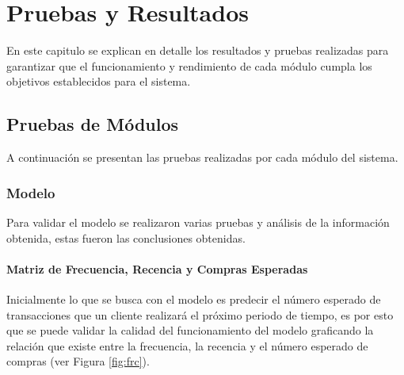 
\chapter{Pruebas y Resultados}

En este capitulo se explican en detalle los resultados y pruebas realizadas para garantizar que el funcionamiento y rendimiento de cada módulo cumpla los objetivos establecidos para el sistema.

\section{Pruebas de Módulos}

A continuación se presentan las pruebas realizadas por cada módulo del sistema.

\subsection{Modelo}

Para validar el modelo se realizaron varias pruebas y análisis de la información obtenida, estas fueron las conclusiones obtenidas.

\subsubsection{Matriz de Frecuencia, Recencia y Compras Esperadas}

Inicialmente lo que se busca con el modelo es predecir el número esperado de transacciones que un cliente realizará el próximo periodo de tiempo, es por esto que se puede validar la calidad del funcionamiento del modelo graficando la relación que existe entre la frecuencia, la recencia y el número esperado de compras (ver Figura \ref{fig:frc}).

